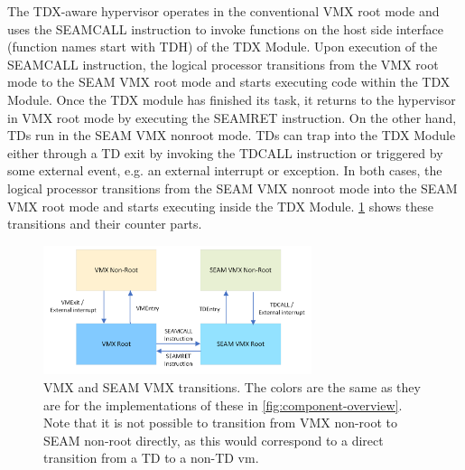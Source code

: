 The TDX-aware hypervisor operates in the conventional VMX root mode and uses the SEAMCALL instruction to invoke functions on the host side interface (function names start with TDH) of the TDX Module. Upon execution of the SEAMCALL instruction, the logical processor transitions from the VMX root mode to the SEAM VMX root mode and starts executing code within the TDX Module. Once the TDX module has finished its task, it returns to the hypervisor in VMX root mode by executing the SEAMRET instruction. On the other hand, TDs run in the SEAM VMX nonroot mode. TDs can trap into the TDX Module either through a TD exit by invoking the TDCALL instruction or triggered by some external event, e.g. an external interrupt or exception. In both cases, the logical processor transitions from the SEAM VMX nonroot mode into the SEAM VMX root mode and starts executing inside the TDX Module. \cref{fig:seamFigure} shows these transitions and their counter parts.

\begin{figure}
\centering
\includegraphics[width=0.7\textwidth]{figures/SEAMVMXÜBergänge.png}
\caption{VMX and SEAM VMX transitions. The colors are the same as they are for the implementations of these in \cref{fig:component-overview}. Note that it is not possible to transition from VMX non-root to SEAM non-root directly, as this would correspond to a direct transition from a TD to a non-TD vm.}
\label{fig:seamFigure}
\end{figure}
